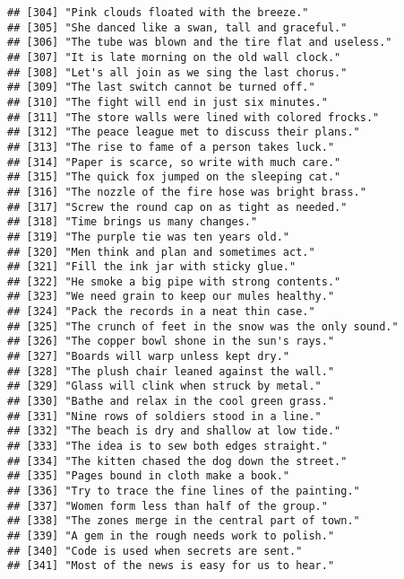 \documentclass[
]{article}
\begin{document}
\begin{verbatim}
## [304] "Pink clouds floated with the breeze."                     
## [305] "She danced like a swan, tall and graceful."               
## [306] "The tube was blown and the tire flat and useless."        
## [307] "It is late morning on the old wall clock."                
## [308] "Let's all join as we sing the last chorus."               
## [309] "The last switch cannot be turned off."                    
## [310] "The fight will end in just six minutes."                  
## [311] "The store walls were lined with colored frocks."          
## [312] "The peace league met to discuss their plans."             
## [313] "The rise to fame of a person takes luck."                 
## [314] "Paper is scarce, so write with much care."                
## [315] "The quick fox jumped on the sleeping cat."                
## [316] "The nozzle of the fire hose was bright brass."            
## [317] "Screw the round cap on as tight as needed."               
## [318] "Time brings us many changes."                             
## [319] "The purple tie was ten years old."                        
## [320] "Men think and plan and sometimes act."                    
## [321] "Fill the ink jar with sticky glue."                       
## [322] "He smoke a big pipe with strong contents."                
## [323] "We need grain to keep our mules healthy."                 
## [324] "Pack the records in a neat thin case."                    
## [325] "The crunch of feet in the snow was the only sound."       
## [326] "The copper bowl shone in the sun's rays."                 
## [327] "Boards will warp unless kept dry."                        
## [328] "The plush chair leaned against the wall."                 
## [329] "Glass will clink when struck by metal."                   
## [330] "Bathe and relax in the cool green grass."                 
## [331] "Nine rows of soldiers stood in a line."                   
## [332] "The beach is dry and shallow at low tide."                
## [333] "The idea is to sew both edges straight."                  
## [334] "The kitten chased the dog down the street."               
## [335] "Pages bound in cloth make a book."                        
## [336] "Try to trace the fine lines of the painting."             
## [337] "Women form less than half of the group."                  
## [338] "The zones merge in the central part of town."             
## [339] "A gem in the rough needs work to polish."                 
## [340] "Code is used when secrets are sent."                      
## [341] "Most of the news is easy for us to hear."                 

\end{verbatim}
\end{document}
